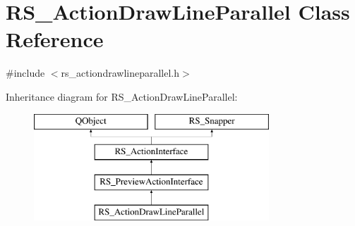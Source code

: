 \hypertarget{classRS__ActionDrawLineParallel}{\section{R\-S\-\_\-\-Action\-Draw\-Line\-Parallel Class Reference}
\label{classRS__ActionDrawLineParallel}
}


{\ttfamily \#include $<$rs\-\_\-actiondrawlineparallel.\-h$>$}

Inheritance diagram for R\-S\-\_\-\-Action\-Draw\-Line\-Parallel\-:\begin{figure}[H]
\begin{center}
\leavevmode
\includegraphics[height=4.000000cm]{classRS__ActionDrawLineParallel}
\end{center}
\end{figure}
